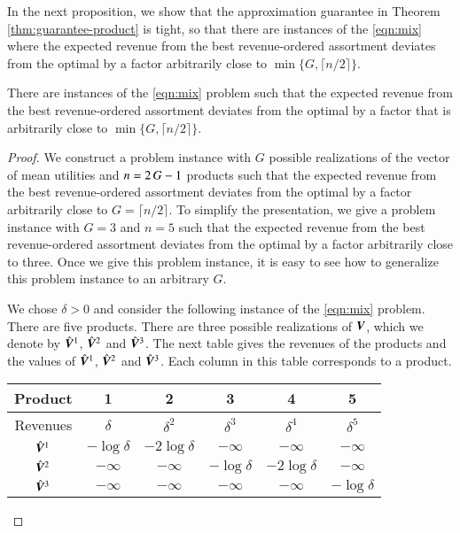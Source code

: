 In the next proposition, we show that the approximation guarantee in Theorem \ref{thm:guarantee-product} is tight, so that there are instances of the \ref{eqn:mix} where the expected revenue  from the best revenue-ordered assortment deviates from the optimal by a factor arbitrarily close to $\min\{ G, \lceil n/2 \rceil \}$. 

\begin{prop}
\label{pro:tight}
There are instances  of the \ref{eqn:mix} problem such that the expected revenue from the best revenue-ordered assortment deviates from the optimal by a factor that is arbitrarily close to $\min\{ G, \lceil n/2 \rceil \}$.
\end{prop}

\begin{proof}
We  construct a problem instance with $G$ possible realizations of the vector of mean utilities and $n = 2 {\,} G -1$ products such that the expected revenue from the best revenue-ordered assortment deviates from the optimal by a factor arbitrarily close to $G = \lceil n /2 \rceil$. To simplify the presentation, we give a problem instance with $G=3$ and $n=5$ such that the expected revenue from the best revenue-ordered assortment deviates from the optimal by a factor arbitrarily close to three. Once we give this problem instance, it is easy to see how to generalize this problem instance to an arbitrary $G$. 

We chose $\delta > 0$ and consider the following instance of the \ref{eqn:mix} problem. There are five products. There are three possible realizations of ${\bm V}$, which we denote by $\hat{{\bm V}}^1$, $\hat{{\bm V}}^2$ and $\hat{{\bm V}}^3$. The next table gives the revenues of the products and the values of $\hat{{\bm V}}^1$, $\hat{{\bm V}}^2$ and $\hat{{\bm V}}^3$. Each column in this table corresponds to a product.

\begin{center}
\footnotesize
\begin{tabular}{cccccc}
\hline
Product   & 1 & 2 & 3 & 4 & 5  \\
\hline
Revenues & $\delta$  & $\delta^2$ & $\delta^3$ & $\delta^4$ & $\delta^5$ \\
\hline
$\hat{{\bm V}}^1$ & $- \log \delta$ & $-2  \log \delta$ & $-\infty$ & $-\infty$ & $-\infty$ \\
$\hat{{\bm V}}^2$ & $-\infty$ & $-\infty$ & $- \log \delta$ & $-2  \log \delta$ & $-\infty$ \\
$\hat{{\bm V}}^3$ & $-\infty$ & $-\infty$ & $-\infty$ & $-\infty$ & $- \log \delta$  \\
\hline 
\end{tabular}
\end{center}


\end{proof}
